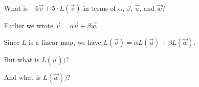 \documentclass{ximera}
\begin{document}
\begin{question}
  What is $-6 \vec{v} + 5 \cdot L(\vec{v})$ in terms of $\alpha$, $\beta$, $\vec{u}$, and $\vec{w}$?
  \begin{solution}
    \begin{hint}
      Earlier we wrote $\vec{v} = \alpha \vec{u} + \beta \vec{w}$.
    \end{hint}

    \begin{hint}
      Since $L$ is a linear map, we have $L(\vec{v}) = \alpha L(\vec{u}) + \beta L(\vec{w})$.
    \end{hint}

    \begin{multiple-choice}
    \end{multiple-choice} 
  \end{solution}

  \begin{question}
    \begin{hint}
      \begin{question}
        \begin{solution}
          But what is $L(\vec{u}))$?

          \begin{multiple-choice}
          \end{multiple-choice} 
        \end{solution}
      \end{question}
    \end{hint}

    \begin{hint}
      \begin{question}
        \begin{solution}
          And what is $L(\vec{w}))$?

          \begin{multiple-choice}
          \end{multiple-choice} 
        \end{solution}
      \end{question}
    \end{hint}


\end{question}
\end{question}
\end{document}
